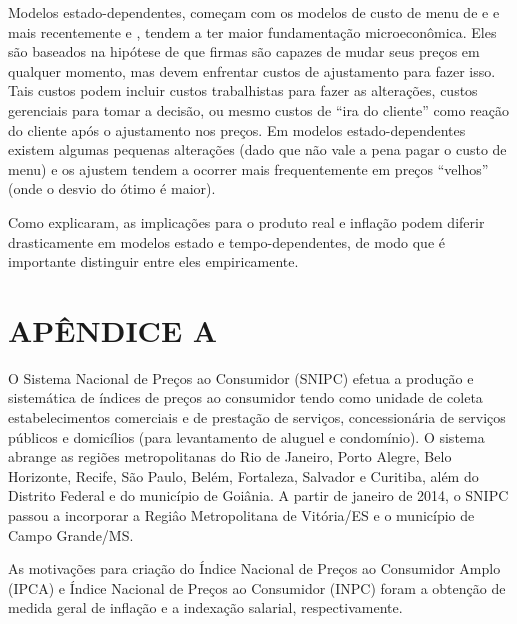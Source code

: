 \documentclass[twoside,a4paper,12pt]{report}
\begin{document}
Modelos estado-dependentes, começam com os modelos de custo de menu de \citet{barro1972theory} e \citet{sheshinski1977inflation} e mais recentemente \citet{dotsey1999state} e \citet{golosov2007menu}, tendem a ter maior fundamentação microeconômica. Eles são baseados na hipótese de que firmas são capazes de mudar seus preços em qualquer momento, mas devem enfrentar custos de ajustamento para fazer isso. Tais custos podem incluir custos trabalhistas para fazer as alterações, custos gerenciais para tomar a decisão, ou mesmo custos de “ira do cliente” como reação do cliente após o ajustamento nos preços. Em modelos estado-dependentes existem algumas pequenas alterações (dado que não vale a pena pagar o custo de menu) e os ajustem tendem a ocorrer mais frequentemente em preços “velhos” (onde o desvio do ótimo é maior).

Como \citet{klenow2008state} explicaram, as implicações para o produto real e inflação podem diferir drasticamente em modelos estado e tempo-dependentes, de modo que é importante distinguir entre eles empiricamente. 








\appendix

\chapter{APÊNDICE A}\label{ap1}

O Sistema Nacional de Preços ao Consumidor (SNIPC) efetua a produção e sistemática de índices de preços ao consumidor tendo como unidade de coleta estabelecimentos comerciais e de prestação de serviços, concessionária de serviços públicos e domicílios (para levantamento de aluguel e condomínio). O sistema abrange as regiões metropolitanas do Rio de Janeiro, Porto Alegre, Belo Horizonte, Recife, São Paulo, Belém, Fortaleza, Salvador e Curitiba, além do Distrito Federal e do município de Goiânia. A partir de janeiro de 2014, o SNIPC passou a incorporar a Regiâo Metropolitana de Vitória/ES e o município de Campo Grande/MS. 

As motivações para criação do Índice Nacional de Preços ao Consumidor Amplo (IPCA) e Índice Nacional de Preços ao Consumidor (INPC) foram a obtenção de medida geral de inflação e a indexação salarial, respectivamente.
\end{document}
